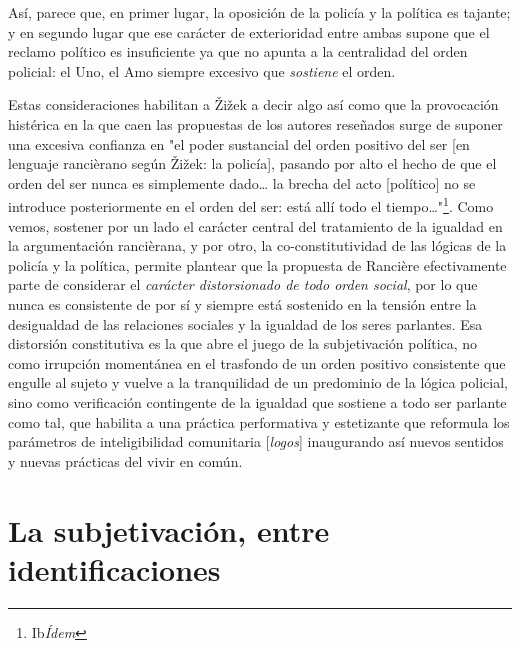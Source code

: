 \documentclass{book}
\begin{document}
Así, parece que, en primer lugar, la oposición de la policía y la
política es tajante; y en segundo lugar que ese carácter de exterioridad
entre ambas supone que el reclamo político es insuficiente ya que no
apunta a la centralidad del orden policial: el Uno, el Amo siempre
excesivo que \emph{sostiene} el orden.

Estas consideraciones habilitan a Žižek a decir algo así como que la
provocación histérica en la que caen las propuestas de los autores
reseñados surge de suponer una excesiva confianza en "el poder
sustancial del orden positivo del ser {[}en lenguaje rancièrano según
Žižek: la policía{]}, pasando por alto el hecho de que el orden del ser
nunca es simplemente dado\ldots{} la brecha del acto {[}político{]} no
se introduce posteriormente en el orden del ser: está allí todo el
tiempo\ldots"\footnote{Ib\emph{Ídem}}. Como vemos, sostener por un lado
el carácter central del tratamiento de la igualdad en la argumentación
rancièrana, y por otro, la co-constitutividad de las lógicas de la
policía y la política, permite plantear que la propuesta de Rancière
efectivamente parte de considerar el \emph{carácter distorsionado de
todo orden social}, por lo que nunca es consistente de por sí y siempre
está sostenido en la tensión entre la desigualdad de las relaciones
sociales y la igualdad de los seres parlantes. Esa distorsión
constitutiva es la que abre el juego de la subjetivación política, no
como irrupción momentánea en el trasfondo de un orden positivo
consistente que engulle al sujeto y vuelve a la tranquilidad de un
predominio de la lógica policial, sino como verificación contingente de
la igualdad que sostiene a todo ser parlante como tal, que habilita a
una práctica performativa y estetizante que reformula los parámetros de
inteligibilidad comunitaria {[}\emph{logos}{]} inaugurando así nuevos
sentidos y nuevas prácticas del vivir en común.

\section{La subjetivación, entre identificaciones}
\end{document}
